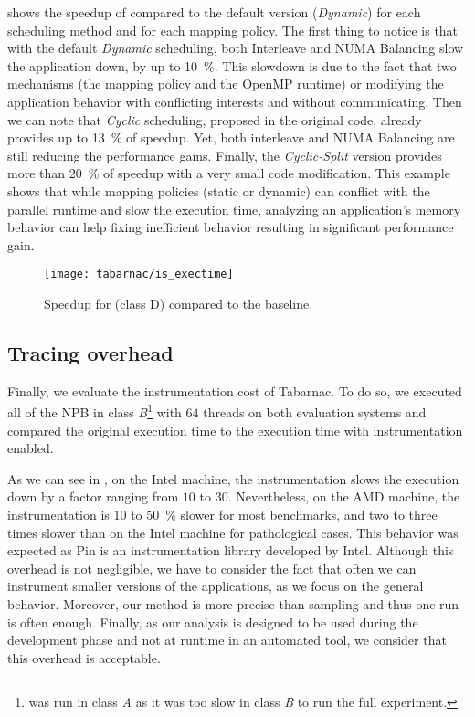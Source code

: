  shows the speedup of \IS compared to the default version (\emph{Dynamic}) for each scheduling method and for each mapping policy.
The first thing to notice is that with the default \emph{Dynamic} scheduling, both Interleave and \gls{NUMA} Balancing slow the application down, by up to \SI{10}{\%}.
This slowdown is due to the fact that two mechanisms (the mapping policy and the \gls{OpenMP} runtime) or modifying the application behavior with conflicting interests and without communicating.
Then we can note that \emph{Cyclic} scheduling, proposed in the original code, already provides up to \SI{13}{\%} of speedup.
Yet, both interleave and \gls{NUMA} Balancing are still reducing the performance gains.
Finally, the \emph{Cyclic-Split} version provides more than \SI{20}{\%} of speedup with a very small code modification.
This example shows that while mapping policies (static or dynamic) can conflict with the parallel runtime and slow the execution time, analyzing an application's memory behavior can help fixing inefficient behavior resulting in significant performance gain.

\begin{figure}[htb]
    \centering
    \texttt{[image: tabarnac/is\_exectime]}
    \caption[Speedup for \IS.]{Speedup for \IS (class D) compared to the baseline.}
\label{fig:is-res}
\end{figure}

\subsection{Tracing overhead}

Finally,  we evaluate the instrumentation cost of \gls{Tabarnac}.
To do so, we executed all of the \gls{NPB} in class \emph{B}\footnote{
    \DC was run in class \emph{A} as it was too slow in class \emph{B} to run the full experiment.
} with $64$ threads on both evaluation systems and compared the original execution time to the execution time with instrumentation enabled.

As we can see in , on the Intel machine, the instrumentation slows the execution down by a factor ranging from $10$ to $30$.
Nevertheless, on the \gls{AMD} machine, the instrumentation is $10$ to \SI{50}{\%} slower for most benchmarks, and two to three times slower than on the \gls{Intel} machine for pathological cases.
This behavior was expected as \gls{Pin} is an instrumentation library developed by \gls{Intel}.
Although this overhead is not negligible, we have to consider the fact that often we can instrument smaller versions of the applications, as we focus on the general behavior.
Moreover, our method is more precise than sampling and thus one run is often enough.
Finally, as our analysis is designed to be used during the development phase and not at runtime in an automated tool, we consider that this overhead is acceptable.


